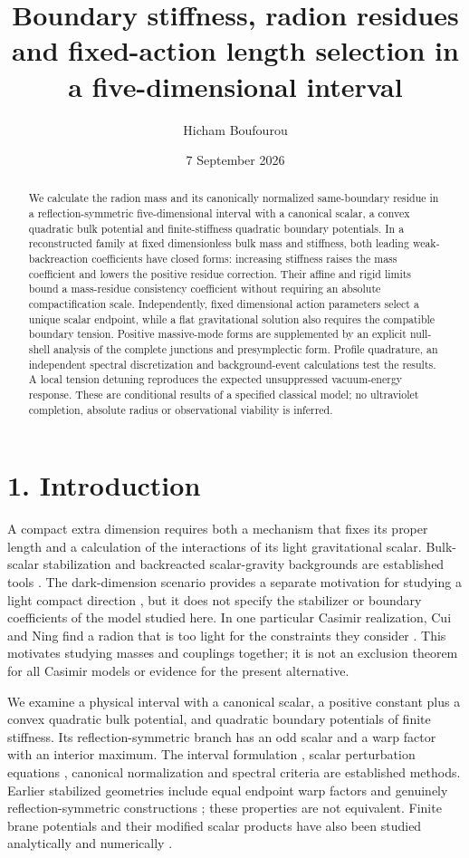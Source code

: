 \documentclass[11pt,a4paper]{article}
\title{Boundary stiffness, radion residues and fixed-action length selection in a five-dimensional interval}
\author{Hicham Boufourou}
\date{7 September 2026}
\begin{document}
\maketitle
\begin{abstract}
We calculate the radion mass and its canonically normalized same-boundary residue in a reflection-symmetric five-dimensional interval with a canonical scalar, a convex quadratic bulk potential and finite-stiffness quadratic boundary potentials. In a reconstructed family at fixed dimensionless bulk mass and stiffness, both leading weak-backreaction coefficients have closed forms: increasing stiffness raises the mass coefficient and lowers the positive residue correction. Their affine and rigid limits bound a mass-residue consistency coefficient without requiring an absolute compactification scale. Independently, fixed dimensional action parameters select a unique scalar endpoint, while a flat gravitational solution also requires the compatible boundary tension. Positive massive-mode forms are supplemented by an explicit null-shell analysis of the complete junctions and presymplectic form. Profile quadrature, an independent spectral discretization and background-event calculations test the results. A local tension detuning reproduces the expected unsuppressed vacuum-energy response. These are conditional results of a specified classical model; no ultraviolet completion, absolute radius or observational viability is inferred.
\end{abstract}
\section*{1. Introduction}
A compact extra dimension requires both a mechanism that fixes its proper length and a calculation of the interactions of its light gravitational scalar. Bulk-scalar stabilization and backreacted scalar-gravity backgrounds are established tools \cite{ref1,ref2}. The dark-dimension scenario provides a separate motivation for studying a light compact direction \cite{ref12}, but it does not specify the stabilizer or boundary coefficients of the model studied here. In one particular Casimir realization, Cui and Ning find a radion that is too light for the constraints they consider \cite{ref15}. This motivates studying masses and couplings together; it is not an exclusion theorem for all Casimir models or evidence for the present alternative.

We examine a physical interval with a canonical scalar, a positive constant plus a convex quadratic bulk potential, and quadratic boundary potentials of finite stiffness. Its reflection-symmetric branch has an odd scalar and a warp factor with an interior maximum. The interval formulation \cite{ref13}, scalar perturbation equations \cite{ref3}, canonical normalization \cite{ref4} and spectral criteria \cite{ref5,ref6,ref14} are established methods. Earlier stabilized geometries include equal endpoint warp factors \cite{ref7} and genuinely reflection-symmetric constructions \cite{ref8}; these properties are not equivalent. Finite brane potentials and their modified scalar products have also been studied analytically and numerically \cite{ref23}.
\end{document}
